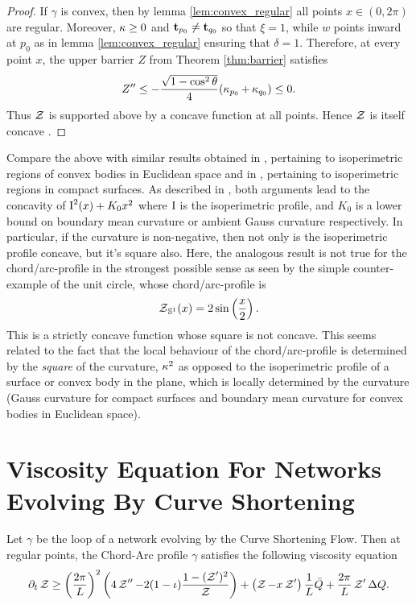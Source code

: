\documentclass[12pt]{amsart}
\begin{document}
\begin{proof}
If $\gamma$ is convex, then by lemma \ref{lem:convex_regular} all points $x \in (0, 2\pi)$ are regular. Moreover, $\operatorname{\kappa} \geq 0$ and $\operatorname{\mathbf{t}}_{p_0} \ne \operatorname{\mathbf{t}}_{q_0}$ so that $\xi = 1$, while \(w\) points inward at $p_0$ as in lemma \ref{lem:convex_regular} ensuring that $\delta = 1$. Therefore, at every point $x$, the upper barrier $Z$ from Theorem \ref{thm:barrier} satisfies
\[
Z'' \leq - \frac{\sqrt{1-\cos^2 \theta}}{4} (\operatorname{\kappa}_{p_0} + \operatorname{\kappa}_{q_0}) \leq 0.
\]
Thus $\operatorname{\mathcal{Z}}$ is supported above by a concave function at all points. Hence $\operatorname{\mathcal{Z}}$ is itself concave \cite[Lemma 2.7]{MR1674097}.
\end{proof}

\begin{remark}
Compare the above with similar results obtained in \cite{MR1674097}, pertaining to isoperimetric regions of convex bodies in Euclidean space and in \cite{MR875084}, pertaining to isoperimetric regions in compact surfaces. As described in \cite{pbthesis}, both arguments lead to the concavity of $\operatorname{I}^2(x) + K_0 x^2$ where $\operatorname{I}$ is the isoperimetric profile, and $K_0$ is a lower bound on boundary mean curvature or ambient Gauss curvature respectively. In particular, if the curvature is non-negative, then not only is the isoperimetric profile concave, but it's square also. Here, the analogous result is not true for the chord/arc-profile in the strongest possible sense as seen by the simple counter-example of the unit circle, whose chord/arc-profile is
\[
\operatorname{\mathcal{Z}}_{\mathbb{S}^1} (x) = 2 \sin \left(\frac{x}{2}\right).
\]
This is a strictly concave function whose square is not concave. This seems related to the fact that the local behaviour of the chord/arc-profile is determined by the \emph{square} of the curvature, $\operatorname{\kappa}^2$ as opposed to the isoperimetric profile of a surface or convex body in the plane, which is locally determined by the curvature (Gauss curvature for compact surfaces and boundary mean curvature for convex bodies in Euclidean space).
\end{remark}

\section{Viscosity Equation For Networks Evolving By Curve Shortening}
\label{sec:viscosity_csf}

\begin{theorem}
\label{thm:csf_viscosity}

Let $\gamma$ be the loop of a network evolving by the Curve Shortening Flow. Then at regular points, the Chord-Arc profile $\gamma$ satisfies the following viscosity equation
\[
\partial_t \operatorname{\mathcal{Z}} \geq \left(\frac{2\pi}{L}\right)^2 \left(4 \operatorname{\mathcal{Z}}'' - 2 (1-\operatorname{\iota}) \frac{1 - (\operatorname{\mathcal{Z}}')^2}{\operatorname{\mathcal{Z}}}\right) + \left(\operatorname{\mathcal{Z}} - x \operatorname{\mathcal{Z}}'\right) \frac{1}{L} \bar{Q} + \frac{2\pi}{L} \operatorname{\mathcal{Z}}' \Delta Q.
\]
\end{theorem}
\end{document}

